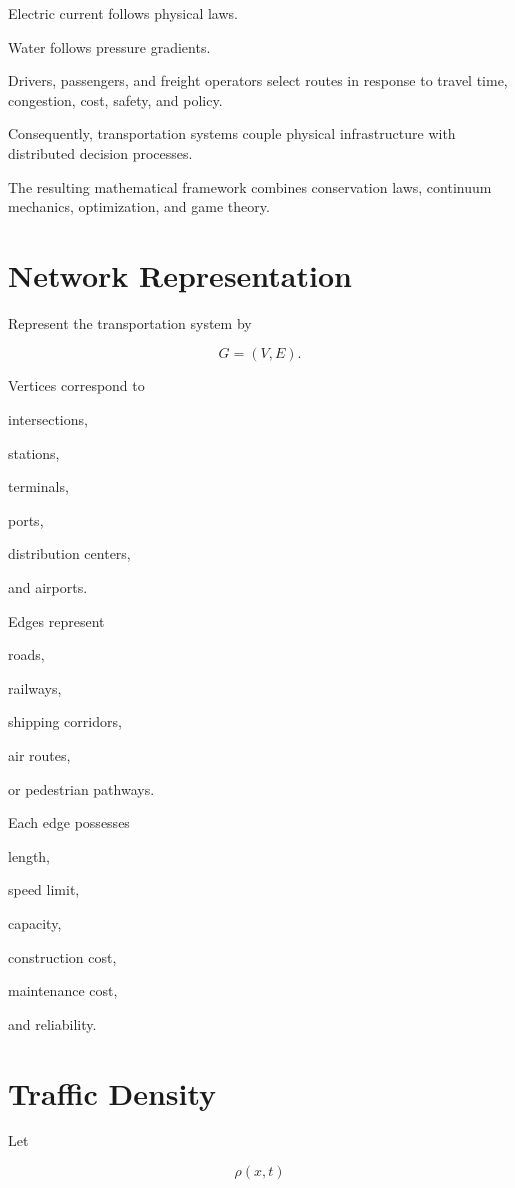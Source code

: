 \documentclass[11pt,fleqn]{book}
\numberwithin{equation}{chapter}
\theoremstyle{plain}
\theoremstyle{definition}
\theoremstyle{remark}
\begin{document}
Electric current follows physical laws.

Water follows pressure gradients.

Drivers, passengers, and freight operators select routes in response to
travel time, congestion, cost, safety, and policy.

Consequently, transportation systems couple physical infrastructure with
distributed decision processes.

The resulting mathematical framework combines conservation laws,
continuum mechanics, optimization, and game theory.


\section{Network Representation}

Represent the transportation system by

\[
G=(V,E).
\]

Vertices correspond to

intersections,

stations,

terminals,

ports,

distribution centers,

and airports.

Edges represent

roads,

railways,

shipping corridors,

air routes,

or pedestrian pathways.

Each edge possesses

length,

speed limit,

capacity,

construction cost,

maintenance cost,

and reliability.


\section{Traffic Density}

Let

\[
\rho(x,t)
\]
\end{document}
